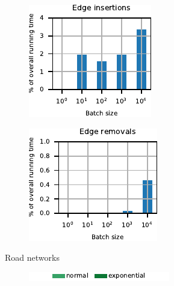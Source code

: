 \begin{figure}[H]
\centering
\begin{subfigure}[b]{.5\textwidth}
\begin{subfigure}[b]{.5\textwidth}
\centering
\includegraphics[width=.9\textwidth]{sources/plots/dyn-mwm/breakdown-road-insertion.pdf}
\end{subfigure}\hfill
\begin{subfigure}[b]{.5\textwidth}
\centering
\includegraphics[width=.9\textwidth]{sources/plots/dyn-mwm/breakdown-road-removal.pdf}
\end{subfigure}
\caption{Road networks}
\end{subfigure}\hfill
\begin{subfigure}[b]{.5\textwidth}
\begin{subfigure}[t]{\textwidth}
\centering
\includegraphics{sources/plots/dyn-mwm/legend-cplx.pdf}
\end{subfigure}


\end{subfigure}
\end{figure}
